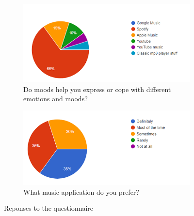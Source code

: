 \documentclass[10pt, notitlepage]{report}
\begin{document}
\newpage

\begin{figure}[h]
\centering
\begin{subfigure}{\textwidth}
	\centering	
	\includegraphics[width=0.9\linewidth]{question-moods.png}
	\caption{Do moods help you express or cope with different emotions and moods?}
	\label{fig:question-moods}
\end{subfigure}
\begin{subfigure}{\textwidth}
	\centering
	\includegraphics[width=0.9\linewidth]{question-format.png}
	\caption{What music application do you prefer?}
	\label{fig:question-format}
\end{subfigure}

\caption{Reponses to the questionnaire}
\label{fig:question}

\end{figure}

\newpage
\end{document}
